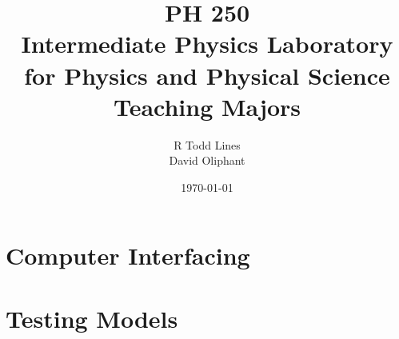 \documentclass{book}
\begin{document}
\frontmatter
\title{{\Huge PH 250}\\
{\Huge {\Large Intermediate Physics Laboratory for Physics and Physical
Science Teaching Majors} }}
\author{R Todd Lines\\ David Oliphant}

\date{\today}
\maketitle
\tableofcontents






\mainmatter

\part{Computer Interfacing}

		
	
		
	
		
	
		


\part{Testing Models}
\end{document}
